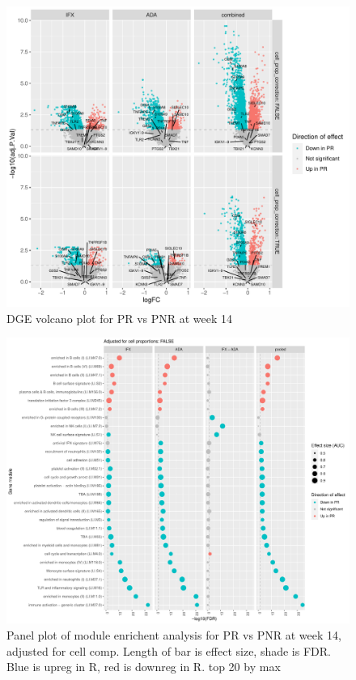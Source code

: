\begin{outline}
\begin{figure}
    \centering
    \includegraphics[width=1.0\textwidth,page=1]{mainmatter/figures/chapter_04/plot_gene_set_enrichment.dge_result_volcano_simple_C_3RI_3NI,C_3RA_3NA,C_3R_3N.pdf}
    \caption{DGE volcano plot for PR vs PNR at week 14}
    \label{fig:multipants_dge_volcano_week_14_R_N}
\end{figure}

\begin{figure}
    \centering
    \includegraphics[width=1.0\textwidth,page=1]{mainmatter/figures/chapter_04/plot_gene_set_enrichment.tmodCERNO_panelplot_reversed_C_3RI_3NI,C_3RA_3NA,C_(3RI_3NI)_(3RA_3NA),C_3R_3N.cell_prop_correction_FALSE.pdf}
    \caption{Panel plot of module enrichent analysis for PR vs PNR at week 14, adjusted for cell comp. Length of bar is effect size, shade is FDR. Blue is upreg in R, red is downreg in R. top 20 by max}
    \label{fig:multipants_dge_panelPlot_week_14_R_N_cellPropF}
\end{figure}


\end{outline}
